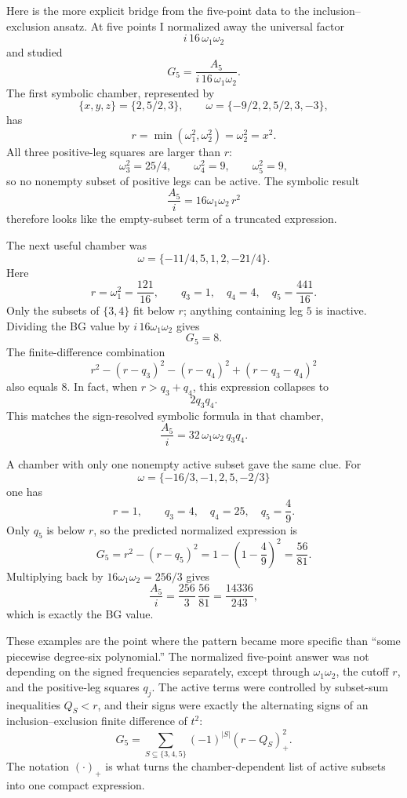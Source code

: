 \documentclass[11pt]{article}
\begin{document}
Here is the more explicit bridge from the five-point data to the
inclusion--exclusion ansatz. At five points I normalized away the universal
factor
\[
    i\,16\,\omega_1\omega_2
\]
and studied
\[
    G_5=\frac{A_5}{i\,16\,\omega_1\omega_2}.
\]
The first symbolic chamber, represented by
\[
    \{x,y,z\}=\{2,5/2,3\},
    \qquad
    \omega=\{-9/2,2,5/2,3,-3\},
\]
has
\[
    r=\min(\omega_1^2,\omega_2^2)=\omega_2^2=x^2.
\]
All three positive-leg squares are larger than \(r\):
\[
    \omega_3^2=25/4,\qquad \omega_4^2=9,\qquad \omega_5^2=9,
\]
so no nonempty subset of positive legs can be active. The symbolic result
\[
    \frac{A_5}{i}=16\omega_1\omega_2\,r^2
\]
therefore looks like the empty-subset term of a truncated expression.

The next useful chamber was
\[
    \omega=\{-11/4,5,1,2,-21/4\}.
\]
Here
\[
    r=\omega_1^2=\frac{121}{16},
    \qquad
    q_3=1,\quad q_4=4,\quad q_5=\frac{441}{16}.
\]
Only the subsets of \(\{3,4\}\) fit below \(r\); anything containing leg \(5\)
is inactive. Dividing the BG value by \(i\,16\omega_1\omega_2\) gives
\[
    G_5=8.
\]
The finite-difference combination
\[
    r^2-(r-q_3)^2-(r-q_4)^2+(r-q_3-q_4)^2
\]
also equals \(8\). In fact, when \(r>q_3+q_4\), this expression collapses to
\[
    2q_3q_4.
\]
This matches the sign-resolved symbolic formula in that chamber,
\[
    \frac{A_5}{i}=32\,\omega_1\omega_2\,q_3q_4.
\]

A chamber with only one nonempty active subset gave the same clue. For
\[
    \omega=\{-16/3,-1,2,5,-2/3\}
\]
one has
\[
    r=1,
    \qquad
    q_3=4,\quad q_4=25,\quad q_5=\frac{4}{9}.
\]
Only \(q_5\) is below \(r\), so the predicted normalized expression is
\[
    G_5=r^2-(r-q_5)^2
       =1-\left(1-\frac{4}{9}\right)^2
       =\frac{56}{81}.
\]
Multiplying back by \(16\omega_1\omega_2=256/3\) gives
\[
    \frac{A_5}{i}=\frac{256}{3}\,\frac{56}{81}
    =\frac{14336}{243},
\]
which is exactly the BG value.

These examples are the point where the pattern became more specific than
``some piecewise degree-six polynomial.''  The normalized five-point answer was
not depending on the signed frequencies separately, except through
\(\omega_1\omega_2\), the cutoff \(r\), and the positive-leg squares \(q_j\).
The active terms were controlled by subset-sum inequalities \(Q_S<r\), and
their signs were exactly the alternating signs of an inclusion--exclusion
finite difference of \(t^2\):
\[
    G_5
    =
    \sum_{S\subseteq\{3,4,5\}}
       (-1)^{|S|}(r-Q_S)_+^2.
\]
The notation \((\cdot)_+\) is what turns the chamber-dependent list of active
subsets into one compact expression.
\end{document}
